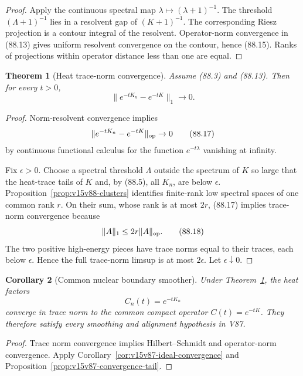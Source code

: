 \documentclass[11pt]{article}
\newtheorem{theorem}{Theorem}[section]
\newtheorem{corollary}[theorem]{Corollary}
\theoremstyle{remark}
\begin{document}
\begin{proof}
Apply the continuous spectral map
\(\lambda\mapsto(\lambda+1)^{-1}\).  The threshold
\((\Lambda+1)^{-1}\) lies in a resolvent gap of
\((K+1)^{-1}\).  The corresponding Riesz projection is a contour
integral of the resolvent.  Operator-norm convergence in (88.13)
gives uniform resolvent convergence on the contour, hence (88.15).
Ranks of projections within operator distance less than one are
equal.
\end{proof}

\begin{theorem}[Heat trace-norm convergence]
\label{thm:v15v88-trace-convergence}
Assume (88.3) and (88.13).  Then for every \(t>0\),
\[
 \|e^{-tK_n}-e^{-tK}\|_1\longrightarrow0.              \tag{88.16}
\]
\end{theorem}

\begin{proof}
Norm-resolvent convergence implies
\[
 \|e^{-tK_n}-e^{-tK}\|_{\rm op}\to0                  \tag{88.17}
\]
by continuous functional calculus for the function
\(e^{-t\lambda}\) vanishing at infinity.

Fix \(\epsilon>0\).  Choose a spectral threshold \(\Lambda\)
outside the spectrum of \(K\) so large that the heat-trace tails
of \(K\) and, by (88.5), all \(K_n\), are below \(\epsilon\).
Proposition~\ref{prop:v15v88-clusters} identifies finite-rank low
spectral spaces of one common rank \(r\).  On their sum, whose rank
is at most \(2r\), (88.17) implies trace-norm convergence because
\[
 \|A\|_1\leq2r\|A\|_{\rm op}.                         \tag{88.18}
\]
The two positive high-energy pieces have trace norms equal to their
traces, each below \(\epsilon\).  Hence the full trace-norm
limsup is at most \(2\epsilon\).  Let \(\epsilon\downarrow0\).
\end{proof}

\begin{corollary}[Common nuclear boundary smoother]
\label{cor:v15v88-common}
Under Theorem~\ref{thm:v15v88-trace-convergence}, the heat factors
\[
 C_n(t)=e^{-tK_n}
\]
converge in trace norm to the common compact operator
\(C(t)=e^{-tK}\).  They therefore satisfy every smoothing and
alignment hypothesis in V87.
\end{corollary}

\begin{proof}
Trace norm convergence implies Hilbert--Schmidt and operator-norm
convergence.  Apply Corollary~\ref{cor:v15v87-ideal-convergence}
and Proposition~\ref{prop:v15v87-convergence-tail}.
\end{proof}
\end{document}
